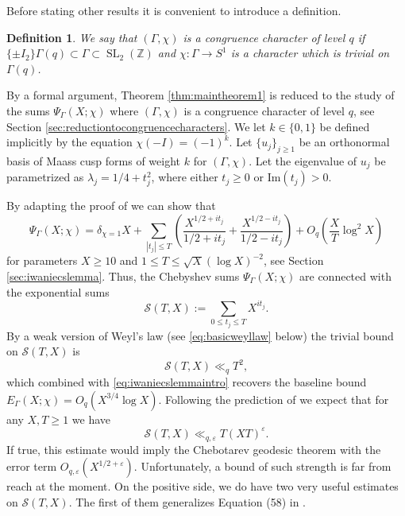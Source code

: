 \documentclass{article}
\newtheorem{defi}[thm]{Definition}
\theoremstyle{named}
\newcommand{\Z}{\mathbb{Z}}
\renewcommand{\S}{\mathcal{S}}
\DeclareMathOperator{\SL}{SL}
\begin{document}
Before stating other results it is convenient to introduce a definition.

\begin{defi}\label{defi:congruencepair}
We say that $(\Gamma, \chi)$ is a \emph{congruence character of level $q$} if $\{\pm I_2\}\Gamma(q)\subset \Gamma \subset \SL_2(\Z)$ and $\chi: \Gamma\rightarrow S^1$ is a character which is trivial on $\Gamma(q)$.
\end{defi}

By a formal argument, Theorem \ref{thm:maintheorem1} is reduced to the study of the sums $\Psi_\Gamma(X; \chi)$ where $(\Gamma, \chi)$ is a congruence character of level $q$, see Section \ref{sec:reductiontocongruencecharacters}. We let $k \in \{0, 1\}$ be defined implicitly by the equation $\chi(-I) = (-1)^k$. Let $\{u_j\}_{j\geq 1}$ be an orthonormal basis of Maass cusp forms of weight $k$ for $(\Gamma, \chi)$. Let the eigenvalue of $u_j$ be parametrized as $\lambda_j = 1/4 + t_j^2$, where either $t_j \geq 0$ or $\text{Im}(t_j) > 0$.

By adapting the proof of \cite[Lemma 1]{Iwaniec1984} we can show that
\begin{equation}\label{eq:iwaniecslemmaintro}
    \Psi_\Gamma(X; \chi) = \delta_{\chi = 1} X + \sum_{|t_j|\leq T}\left(\frac{X^{1/2 + it_j}}{1/2 + it_j} + \frac{X^{1/2 -it_j}}{1/2 - it_j}\right) + O_q\left(\frac{X}{T}\log^2 X\right)
\end{equation}
for parameters $X \geq 10$ and $1 \leq T \leq \sqrt{X}(\log X)^{-2}$, see Section \ref{sec:iwaniecslemma}. Thus, the Chebyshev sums $\Psi_{\Gamma}(X; \chi)$ are connected with the exponential sums 
\begin{equation}\label{eq:defspectralexponential}
    \S(T, X) := \sum_{0 \leq t_j \leq T} X^{it_j}.
\end{equation}
By a weak version of Weyl's law (see \eqref{eq:basicweyllaw} below) the trivial bound on $\S(T, X)$ is 
\begin{equation}\label{eq:trivialboundexponentialsum}
    \S(T, X) \ll_q T^2,
\end{equation}
which combined with \eqref{eq:iwaniecslemmaintro} recovers the baseline bound $E_\Gamma(X; \chi) = O_q(X^{3/4}\log X)$. 
Following the prediction of \cite[Conjecture 2.2]{petridisrisagerlocalaverage} we expect that for any $X, T \geq 1$ we have
\begin{equation*}
    \S(T, X) \ll_{q, \varepsilon}T(XT)^\varepsilon.
\end{equation*}
If true, this estimate would imply the Chebotarev geodesic theorem with the error term $O_{q, \varepsilon}(X^{1/2 + \varepsilon})$. Unfortunately, a bound of such strength is far from reach at the moment. On the positive side, we do have two very useful estimates on $\S(T, X)$. The first of them generalizes Equation (58) in \cite{luosarnak}. 
\end{document}
